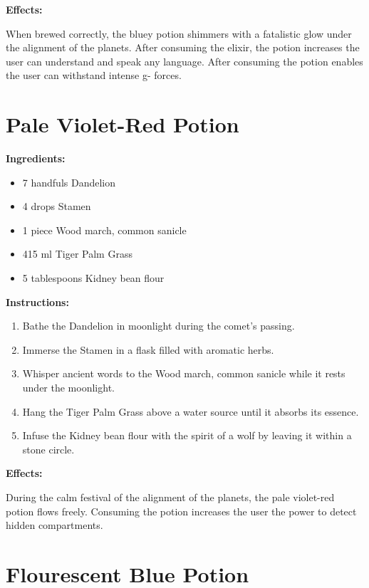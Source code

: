 \documentclass{article}
\begin{document}
\textbf{Effects:}

When brewed correctly, the bluey potion shimmers with a fatalistic glow under the alignment of the planets. After consuming the elixir, the potion increases the user can understand and speak any language. After consuming the potion enables the user can withstand intense g- forces.

\newpage
\section*{Pale Violet-Red Potion}

\textbf{Ingredients:}

\begin{itemize}
  \item 7 handfuls Dandelion
  \item 4 drops Stamen
  \item 1 piece Wood march, common sanicle
  \item 415 ml Tiger Palm Grass
  \item 5 tablespoons Kidney bean flour
\end{itemize}

\textbf{Instructions:}

\begin{enumerate}
  \item Bathe the Dandelion in moonlight during the comet’s passing.
  \item Immerse the Stamen in a flask filled with aromatic herbs.
  \item Whisper ancient words to the Wood march, common sanicle while it rests under the moonlight.
  \item Hang the Tiger Palm Grass above a water source until it absorbs its essence.
  \item Infuse the Kidney bean flour with the spirit of a wolf by leaving it within a stone circle.
\end{enumerate}

\textbf{Effects:}

During the calm festival of the alignment of the planets, the pale violet-red potion flows freely. Consuming the potion increases the user the power to detect hidden compartments.

\newpage
\section*{Flourescent Blue Potion}
\end{document}
